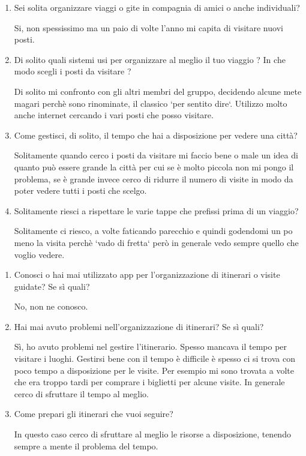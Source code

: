 \begin{enumerate}

\item Sei solita organizzare viaggi o gite in compagnia di amici o anche individuali?

Si, non spessissimo ma un paio di volte l'anno mi capita di visitare nuovi posti.

\item Di solito quali sistemi usi per organizzare al meglio il tuo viaggio ? In che modo scegli i posti da visitare ?

Di solito mi confronto con gli altri membri del gruppo, decidendo alcune mete magari perchè sono rinominate, il classico `per sentito dire`. Utilizzo molto anche internet cercando i vari posti che posso visitare.

\item Come gestisci, di solito, il tempo che hai a disposizione per vedere una città?

Solitamente quando cerco i posti da visitare mi faccio bene o male un idea di quanto può essere grande la città per cui se è molto piccola non mi pongo il problema, se è grande invece cerco di ridurre il numero di visite in modo da poter vedere tutti i posti che scelgo.

\item Solitamente riesci a rispettare le varie tappe che prefissi prima di un viaggio?

Solitamente ci riesco, a volte faticando parecchio e quindi godendomi un po meno la visita perchè `vado di fretta` però in generale vedo sempre quello che voglio vedere.

\end{enumerate}

\clearpage
{}

\begin{enumerate}

\item Conosci o hai mai utilizzato app per l'organizzazione di itinerari o visite guidate? Se sì quali?

No, non ne conosco.

\item Hai mai avuto problemi nell'organizzazione di itinerari? Se sì quali?

Sì, ho avuto problemi nel gestire l'itinerario. Spesso mancava il tempo per visitare i luoghi. Gestirsi bene con il tempo è difficile è spesso ci si trova con poco tempo a disposizione per le visite. Per esempio mi sono trovata a volte che era troppo tardi per comprare i biglietti per alcune visite. In generale cerco di sfruttare il tempo al meglio.

\item Come prepari gli itinerari che vuoi seguire?

In questo caso cerco di sfruttare al meglio le risorse a disposizione, tenendo sempre a mente il problema del tempo.

\end{enumerate}

